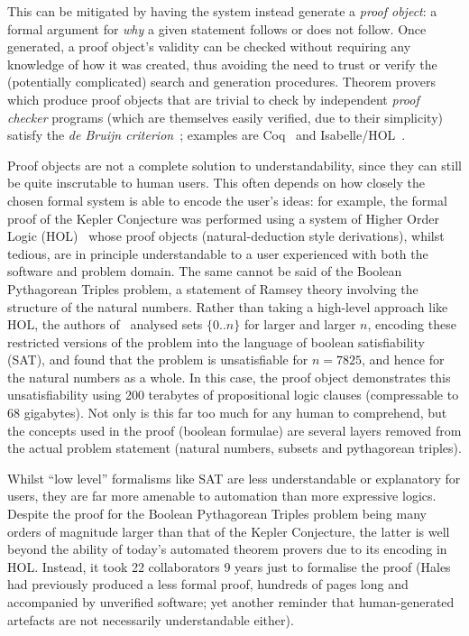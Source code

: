 \documentclass[letterpaper]{article}
\begin{document}
This can be mitigated by having the system instead
generate a \emph{proof object}: a formal argument for \emph{why} a
given statement follows or does not follow. Once generated, a proof
object's validity can be checked without requiring any knowledge of
how it was created, thus avoiding the need to trust or verify the
(potentially complicated) search and generation procedures. Theorem provers
which produce proof objects that are trivial to check by independent
\emph{proof checker} programs (which are themselves
easily verified, due to their simplicity) satisfy the
\emph{de Bruijn criterion}~\cite{barendregt2005challenge}; examples are
Coq~\cite{barras1997coq} and Isabelle/HOL~\cite{nipkow2002isabelle}.

Proof objects are not a complete solution to understandability, since
they can still be quite inscrutable to human users. This often depends
on how closely the chosen formal system is able to encode the user's
ideas: for example, the formal proof of the Kepler Conjecture was
performed using a system of Higher Order Logic
(HOL)~\cite{hales2015formal} whose proof objects (natural-deduction
style derivations), whilst tedious, are in principle understandable to
a user experienced with both the software and problem domain. The same
cannot be said of the Boolean Pythagorean Triples problem, a statement
of Ramsey theory involving the structure of the natural
numbers. Rather than taking a high-level approach like HOL, the
authors of~\cite{heule2016solving} analysed sets $\{0..n\}$ for larger
and larger $n$, encoding these restricted versions of the problem into
the language of boolean satisfiability (SAT), and found that the
problem is unsatisfiable for $n= 7825$, and hence for the natural
numbers as a whole. In this case, the proof object demonstrates this
unsatisfiability using 200 terabytes of propositional logic clauses
(compressable to 68 gigabytes).  Not only is this far too much for any
human to comprehend, but the concepts used in the proof (boolean
formulae) are several layers removed from the actual problem statement
(natural numbers, subsets and pythagorean triples).

Whilst ``low level'' formalisms like SAT are less understandable or
explanatory for users, they are far more amenable to automation than
more expressive logics.  Despite the proof for the Boolean Pythagorean
Triples problem being many orders of magnitude larger than that of the
Kepler Conjecture, the latter is well beyond the ability of today's
automated theorem provers due to its encoding in HOL. Instead, it took
22 collaborators 9 years just to formalise the proof (Hales had
previously produced a less formal proof, hundreds of pages long and
accompanied by unverified software; yet another reminder that
human-generated artefacts are not necessarily understandable either).
\end{document}
